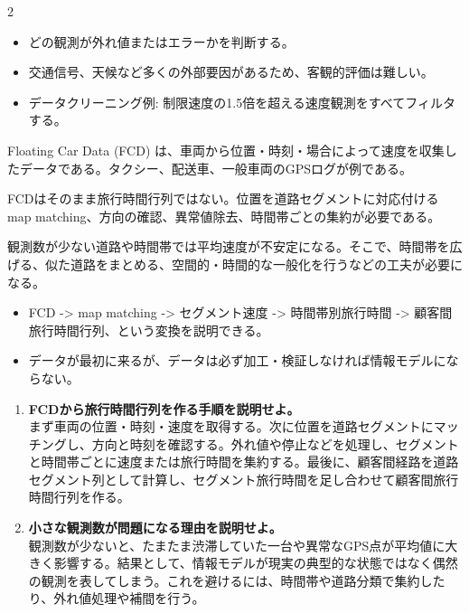 \clearpage
{}
\begin{multicols}{2}\footnotesize\raggedcolumns
{}
\begin{itemize}
\item どの観測が外れ値またはエラーかを判断する。
\item 交通信号、天候など多くの外部要因があるため、客観的評価は難しい。
\item データクリーニング例: 制限速度の1.5倍を超える速度観測をすべてフィルタする。
\end{itemize}
Floating Car Data (FCD) は、車両から位置・時刻・場合によって速度を収集したデータである。タクシー、配送車、一般車両のGPSログが例である。\par

FCDはそのまま旅行時間行列ではない。位置を道路セグメントに対応付ける map matching、方向の確認、異常値除去、時間帯ごとの集約が必要である。\par

観測数が少ない道路や時間帯では平均速度が不安定になる。そこで、時間帯を広げる、似た道路をまとめる、空間的・時間的な一般化を行うなどの工夫が必要になる。\par
{}
\begin{itemize}
\item FCD -> map matching -> セグメント速度 -> 時間帯別旅行時間 -> 顧客間旅行時間行列、という変換を説明できる。
\item データが最初に来るが、データは必ず加工・検証しなければ情報モデルにならない。
\end{itemize}
\begin{enumerate}
\item \textbf{FCDから旅行時間行列を作る手順を説明せよ。}\\まず車両の位置・時刻・速度を取得する。次に位置を道路セグメントにマッチングし、方向と時刻を確認する。外れ値や停止などを処理し、セグメントと時間帯ごとに速度または旅行時間を集約する。最後に、顧客間経路を道路セグメント列として計算し、セグメント旅行時間を足し合わせて顧客間旅行時間行列を作る。
\item \textbf{小さな観測数が問題になる理由を説明せよ。}\\観測数が少ないと、たまたま渋滞していた一台や異常なGPS点が平均値に大きく影響する。結果として、情報モデルが現実の典型的な状態ではなく偶然の観測を表してしまう。これを避けるには、時間帯や道路分類で集約したり、外れ値処理や補間を行う。
\end{enumerate}
\end{multicols}

